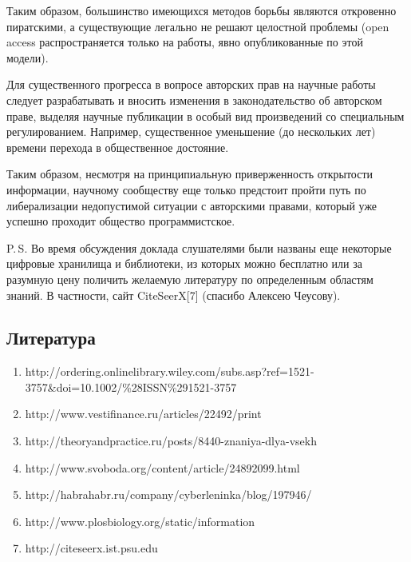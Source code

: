 \documentclass[10pt, a5paper]{article}
\begin{document}
Таким образом, большинство имеющихся методов борьбы являются откровенно пиратскими, а существующие легально не решают целостной проблемы (open access распространяется только на работы, явно опубликованные по этой модели).

Для существенного прогресса в вопросе авторских прав на научные работы следует разрабатывать и вносить изменения в законодательство об авторском праве, выделяя научные публикации в особый вид произведений со специальным регулированием. Например, существенное уменьшение (до нескольких лет) времени перехода в общественное достояние.

Таким образом, несмотря на принципиальную приверженность открытости информации, научному сообществу еще только предстоит пройти путь по либерализации недопустимой ситуации с авторскими правами, который уже успешно проходит общество программистское.

P.\,S. Во время обсуждения доклада слушателями были названы еще некоторые цифровые хранилища и библиотеки, из которых можно бесплатно или за разумную цену поличить желаемую литературу по определенным областям знаний. В частности, сайт CiteSeerX[7] (спасибо Алексею Чеусову).

\subsection*{Литература}

\begin{enumerate}
 \item http://ordering.onlinelibrary.wiley.com/subs.asp?ref=1521-3757\&\linebreak{}doi=10.1002/\%28ISSN\%291521-3757
 \item http://www.vestifinance.ru/articles/22492/print
 \item http://theoryandpractice.ru/posts/8440-znaniya-dlya-vsekh
 \item http://www.svoboda.org/content/article/24892099.html
 \item http://habrahabr.ru/company/cyberleninka/blog/197946/
 \item http://www.plosbiology.org/static/information
 \item http://citeseerx.ist.psu.edu
\end{enumerate}
\end{document}
